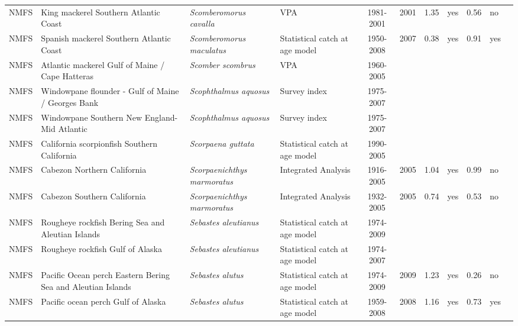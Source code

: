 \begin{longtable}{p{1.8cm}p{3.5cm}p{3.5cm}p{3cm}cccp{0.9cm}cp{0.9cm}c}
  NMFS & King mackerel Southern Atlantic Coast & \textit{Scomberomorus cavalla} & VPA & 1981-2001 & 2001 & 1.35 & yes & 0.56 & no & \cite{JENSEN_KMACKGMSATLC_2004.pdf} \\ 
  NMFS & Spanish mackerel Southern Atlantic Coast & \textit{Scomberomorus maculatus} & Statistical catch at age model & 1950-2008 & 2007 & 0.38 & yes & 0.91 & yes & \cite{JENSEN_SPANMACKSATLC_2008.pdf} \\ 
  NMFS & Atlantic mackerel Gulf of Maine / Cape Hatteras & \textit{Scomber scombrus} & VPA & 1960-2005 &  &  &  &  &  & \cite{AtlanticMackerel2005.pdf} \\ 
  NMFS & Windowpane flounder - Gulf of Maine / Georges Bank & \textit{Scophthalmus aquosus} & Survey index & 1975-2007 &  &  &  &  &  & \cite{garm3p.pdf} \\ 
  NMFS & Windowpane Southern New England-Mid Atlantic & \textit{Scophthalmus aquosus} & Survey index & 1975-2007 &  &  &  &  &  & \cite{http://www.nefsc.noaa.gov/nefsc/publications/crd/crd0815/crd0815.pdf} \\ 
  NMFS & California scorpionfish Southern California & \textit{Scorpaena guttata} & Statistical catch at age model & 1990-2005 &  &  &  &  &  & \cite{Scorpionfish_assessment_report_2005.pdf} \\ 
  NMFS & Cabezon Northern California & \textit{Scorpaenichthys marmoratus} & Integrated Analysis & 1916-2005 & 2005 & 1.04 & yes & 0.99 & no & \cite{2005-SAFE-WCcabezon.pdf} \\ 
  NMFS & Cabezon Southern California & \textit{Scorpaenichthys marmoratus} & Integrated Analysis & 1932-2005 & 2005 & 0.74 & yes & 0.53 & no & \cite{2005_SAFE_Wccabezon.pdf} \\ 
  NMFS & Rougheye rockfish Bering Sea and Aleutian Islands & \textit{Sebastes aleutianus} & Statistical catch at age model & 1974-2009 &  &  &  &  &  & \cite{2008 SAFE BSAIrougheye.pdf} \\ 
  NMFS & Rougheye rockfish Gulf of Alaska & \textit{Sebastes aleutianus} & Statistical catch at age model & 1974-2007 &  &  &  &  &  & \cite{AFSC-RYEROCKGA-2008-Rougheye rockfish GA.pdf} \\ 
  NMFS & Pacific Ocean perch Eastern Bering Sea and Aleutian Islands & \textit{Sebastes alutus} & Statistical catch at age model & 1974-2009 & 2009 & 1.23 & yes & 0.26 & no & \cite{2008_SAFE_BSAIpop.pdf} \\ 
  NMFS & Pacific ocean perch Gulf of Alaska & \textit{Sebastes alutus} & Statistical catch at age model & 1959-2008 & 2008 & 1.16 & yes & 0.73 & yes & \cite{AFSC-POPERCHGA-2008-Pacific ocean perch GA.pdf} \\ 

\end{longtable}
